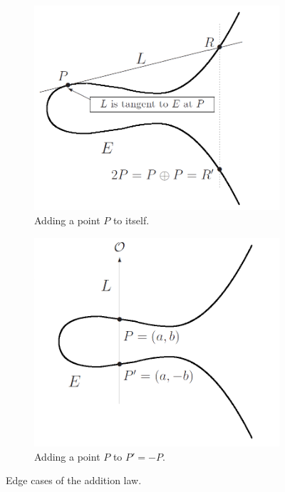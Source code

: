 \documentclass[9pt]{article}
\theoremstyle{definition}
\begin{document}
\begin{figure}[h]
	\centering
	\begin{subfigure}[b]{0.4\textwidth}
		\centering
		\includegraphics[width=1.17\textwidth]{addPtoP.png}
		\caption{Adding a point $P$ to itself.}
		\label{fig:addPtoP}
	\end{subfigure}
	\begin{subfigure}[b]{0.4\textwidth}
		\centering
		\includegraphics[width=1.15\textwidth]{addPto-P.png}
		\caption{Adding a point $P$ to $P' = -P$.}
		\label{fig:addPto-P}
	\end{subfigure}
	\hfill
	\caption{Edge cases of the addition law.}
	\label{fig:2cases}
\end{figure}
\end{document}
